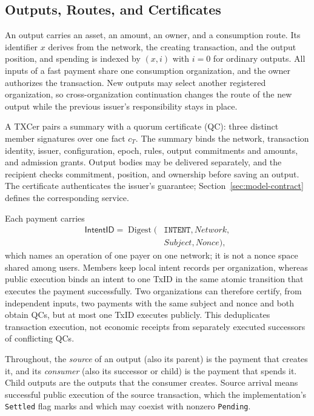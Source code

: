 \subsection{Outputs, Routes, and Certificates}
\label{sec:model-certificates}
An output carries an asset, an amount, an owner, and a consumption route. Its identifier $x$ derives from the network, the creating transaction, and the output position, and spending is indexed by $(x,i)$ with $i=0$ for ordinary outputs. All inputs of a fast payment share one consumption organization, and the owner authorizes the transaction. New outputs may select another registered organization, so cross-organization continuation changes the route of the new output while the previous issuer's responsibility stays in place.

A TXCer pairs a summary with a quorum certificate (QC): three distinct member signatures over one fact $c_T$. The summary binds the network, transaction identity, issuer, configuration, epoch, rules, output commitments and amounts, and admission grants. Output bodies may be delivered separately, and the recipient checks commitment, position, and ownership before saving an output. The certificate authenticates the issuer's guarantee; Section~\ref{sec:model-contract} defines the corresponding service.

Each payment carries
\[\begin{aligned}
\mathsf{IntentID}=\operatorname{Digest}(&\texttt{INTENT},\mathit{Network},\\
&\mathit{Subject},\mathit{Nonce}),
\end{aligned}\]
which names an operation of one payer on one network; it is not a nonce space shared among users. Members keep local intent records per organization, whereas public execution binds an intent to one TxID in the same atomic transition that executes the payment successfully. Two organizations can therefore certify, from independent inputs, two payments with the same subject and nonce and both obtain QCs, but at most one TxID executes publicly. This deduplicates transaction execution, not economic receipts from separately executed successors of conflicting QCs.

Throughout, the \emph{source} of an output (also its parent) is the payment that creates it, and its \emph{consumer} (also its successor or child) is the payment that spends it. Child outputs are the outputs that the consumer creates. Source arrival means successful public execution of the source transaction, which the implementation's \texttt{Settled} flag marks and which may coexist with nonzero \texttt{Pending}.

